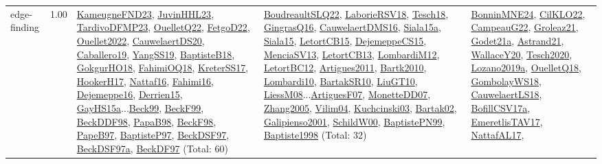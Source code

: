 {\begin{longtable}{p{3cm}r>{\raggedright\arraybackslash}p{6cm}>{\raggedright\arraybackslash}p{6cm}>{\raggedright\arraybackslash}p{8cm}}
\index{edge-finding}\index{Algorithms!edge-finding}edge-finding &  1.00 & \hyperref[detail:KameugneFND23]{KameugneFND23}, \hyperref[detail:JuvinHHL23]{JuvinHHL23}, \hyperref[detail:TardivoDFMP23]{TardivoDFMP23}, \hyperref[detail:OuelletQ22]{OuelletQ22}, \hyperref[detail:FetgoD22]{FetgoD22}, \hyperref[detail:Ouellet2022]{Ouellet2022}, \hyperref[detail:CauwelaertDS20]{CauwelaertDS20}, \hyperref[detail:Caballero19]{Caballero19}, \hyperref[detail:YangSS19]{YangSS19}, \hyperref[detail:BaptisteB18]{BaptisteB18}, \hyperref[detail:GokgurHO18]{GokgurHO18}, \hyperref[detail:FahimiOQ18]{FahimiOQ18}, \hyperref[detail:KreterSS17]{KreterSS17}, \hyperref[detail:HookerH17]{HookerH17}, \hyperref[detail:Nattaf16]{Nattaf16}, \hyperref[detail:Fahimi16]{Fahimi16}, \hyperref[detail:Dejemeppe16]{Dejemeppe16}, \hyperref[detail:Derrien15]{Derrien15}, \hyperref[detail:GayHS15a]{GayHS15a}...\hyperref[detail:Beck99]{Beck99}, \hyperref[detail:BeckF99]{BeckF99}, \hyperref[detail:BeckDDF98]{BeckDDF98}, \hyperref[detail:PapaB98]{PapaB98}, \hyperref[detail:BeckF98]{BeckF98}, \hyperref[detail:PapeB97]{PapeB97}, \hyperref[detail:BaptisteP97]{BaptisteP97}, \hyperref[detail:BeckDSF97]{BeckDSF97}, \hyperref[detail:BeckDSF97a]{BeckDSF97a}, \hyperref[detail:BeckDF97]{BeckDF97} (Total: 60) & \hyperref[detail:BoudreaultSLQ22]{BoudreaultSLQ22}, \hyperref[detail:LaborieRSV18]{LaborieRSV18}, \hyperref[detail:Tesch18]{Tesch18}, \hyperref[detail:GingrasQ16]{GingrasQ16}, \hyperref[detail:CauwelaertDMS16]{CauwelaertDMS16}, \hyperref[detail:Siala15a]{Siala15a}, \hyperref[detail:Siala15]{Siala15}, \hyperref[detail:LetortCB15]{LetortCB15}, \hyperref[detail:DejemeppeCS15]{DejemeppeCS15}, \hyperref[detail:MenciaSV13]{MenciaSV13}, \hyperref[detail:LetortCB13]{LetortCB13}, \hyperref[detail:LombardiM12]{LombardiM12}, \hyperref[detail:LetortBC12]{LetortBC12}, \hyperref[detail:Artigues2011]{Artigues2011}, \hyperref[detail:Bartk2010]{Bartk2010}, \hyperref[detail:Lombardi10]{Lombardi10}, \hyperref[detail:BartakSR10]{BartakSR10}, \hyperref[detail:LiuGT10]{LiuGT10}, \hyperref[detail:LiessM08]{LiessM08}...\hyperref[detail:ArtiguesF07]{ArtiguesF07}, \hyperref[detail:MonetteDD07]{MonetteDD07}, \hyperref[detail:Zhang2005]{Zhang2005}, \hyperref[detail:Vilim04]{Vilim04}, \hyperref[detail:Kuchcinski03]{Kuchcinski03}, \hyperref[detail:Bartak02]{Bartak02}, \hyperref[detail:Galipienso2001]{Galipienso2001}, \hyperref[detail:SchildW00]{SchildW00}, \hyperref[detail:BaptistePN99]{BaptistePN99}, \hyperref[detail:Baptiste1998]{Baptiste1998} (Total: 32) & \hyperref[detail:BonninMNE24]{BonninMNE24}, \hyperref[detail:CilKLO22]{CilKLO22}, \hyperref[detail:CampeauG22]{CampeauG22}, \hyperref[detail:Groleaz21]{Groleaz21}, \hyperref[detail:Godet21a]{Godet21a}, \hyperref[detail:Astrand21]{Astrand21}, \hyperref[detail:WallaceY20]{WallaceY20}, \hyperref[detail:Tesch2020]{Tesch2020}, \hyperref[detail:Lozano2019a]{Lozano2019a}, \hyperref[detail:OuelletQ18]{OuelletQ18}, \hyperref[detail:GombolayWS18]{GombolayWS18}, \hyperref[detail:CauwelaertLS18]{CauwelaertLS18}, \hyperref[detail:BofillCSV17a]{BofillCSV17a}, \hyperref[detail:EmeretlisTAV17]{EmeretlisTAV17}, \hyperref[detail:NattafAL17]{NattafAL17}, 
\end{longtable}}
